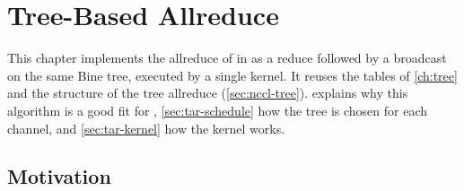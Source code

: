 
\newcommand{\binerot}[2]{%
  \begin{tikzpicture}[baseline=(lab.north), x=0.85cm, y=0.75cm,
      rank/.style={circle, draw, minimum size=0.55cm, inner sep=0pt,
                   fill=white, font=\scriptsize},
      e/.style={-{Stealth[length=2mm]}, line width=1.2pt, black!45,
                shorten >=1pt, shorten <=1pt}]
    \useasboundingbox (-1.8,0.5) rectangle (2.7,-4.5);
    \foreach \i/\px/\py in {0/0.7/0, 3/-0.6/-1.1, 7/0.9/-1.1, 1/2.1/-1.1,
                            4/-1.3/-2.2, 2/-0.1/-2.2, 6/0.9/-2.2, 5/-1.3/-3.3} {
      \pgfmathtruncatemacro{\rk}{mod(\i+#1,8)}
      \node[rank] (n\i) at (\px,\py) {\rk};
    }
    \foreach \a/\b in {0/3,0/7,0/1,3/4,3/2,7/6,4/5} \draw[e] (n\a) -- (n\b);
    \pgfmathtruncatemacro{\rt}{mod(#1,8)}
    \node[rank, draw=crosslink, fill=crosslink!20, thick] at (n0) {\rt};
    \node[font=\footnotesize, align=center] (lab) at (0.45,-4.1) {#2};
  \end{tikzpicture}%
}

\chapter{Tree-Based Allreduce}\label{ch:treeallreduce}
This chapter implements the allreduce of \bine{} in \nccl{} as a reduce followed by a broadcast on the same Bine tree, executed by a single kernel.
It reuses the tables of \cref{ch:tree} and the structure of the \nccl{} tree allreduce (\cref{sec:nccl-tree}).
 explains why this algorithm is a good fit for \nccl{}, \cref{sec:tar-schedule} how the tree is chosen for each channel, and \cref{sec:tar-kernel} how the kernel works.
\section{Motivation}\label{sec:tar-motivation}
